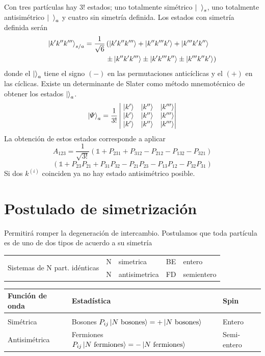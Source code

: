 \documentclass[10pt,oneside]{CBFT_book}
\begin{document}
Con tres partículas hay $3!$ estados; uno totalmente simétrico $\Ket{\phantom{k}}_s$, uno totalmente antisimétrico 
$\Ket{\phantom{k}}_a$ y cuatro sin simetría definida.
Los estados con simetría definida serán 
\begin{align*}
	\Ket{k'k''k'''}_{s/a} = \frac{1}{\sqrt{6}}&\left( \Ket{k'k''k'''} +  \Ket{k''k'''k'} + \Ket{k'''k'k''}\right. \\
	& \left. \pm \Ket{k''k'k'''} \pm \Ket{k'k'''k''} \pm \Ket{k'''k''k'} \right)
\end{align*}
donde el $\Ket{}_a$ tiene el signo $(-)$ en las permutaciones anticíclicas y el $(+)$ en las cíclicas.
Existe un determinante de Slater como método mnemotécnico de obtener los estados $\Ket{}_a$.
\[
	\Ket{ \Psi }_a = \frac{1}{3!}\begin{vmatrix} \; \Ket{k'} & \Ket{k''} & \Ket{k'''} \\  
	\; \Ket{k'} & \Ket{k''} & \Ket{k'''} \\ \; \Ket{k'} & \Ket{k''} & \Ket{k'''} \end{vmatrix}
\]
La obtención de estos estados corresponde a aplicar 
\[
	A_{123} = \frac{1}{\sqrt{3!}}\left( \mathbb{1} + P_{231} + P_{312} - P_{212} - P_{132} - P_{321} \right)
\]
\[
	( \mathbb{1} + P_{23}P_{21} + P_{31}P_{32} - P_{21}P_{23} - P_{13}P_{12} - P_{32}P_{31} )
\]
Si dos $k^{(i)}$ coinciden ya no hay estado antisimétrico posible.

\section{Postulado de simetrización}

Permitirá romper la degeneración de intercambio. 
Postulamos que toda partícula es de uno de dos tipos de acuerdo a su simetría 

\begin{center}
\begin{tabular}{|c|l|l|l|l|}
\multirow{2}{*}{Sistemas de N part. idénticas} & N & simetrica & BE & entero\\
& N & antisimetrica & FD & semientero
\end{tabular}
\end{center}

\begin{center}
\begin{tabular}{lll}
Función de onda & Estadística & Spin \\
\hline \\
Simétrica & Bosones $P_{ij}\Ket{ N \text{ bosones}} = 
+ \Ket{ N \text{ bosones}} $ & Entero\\
Antisimétrica & Fermiones $P_{ij}\Ket{ N \text{ fermiones}} = 
- \Ket{ N \text{ fermiones}} $ & Semi-entero
\end{tabular}
\end{center}
\end{document}
